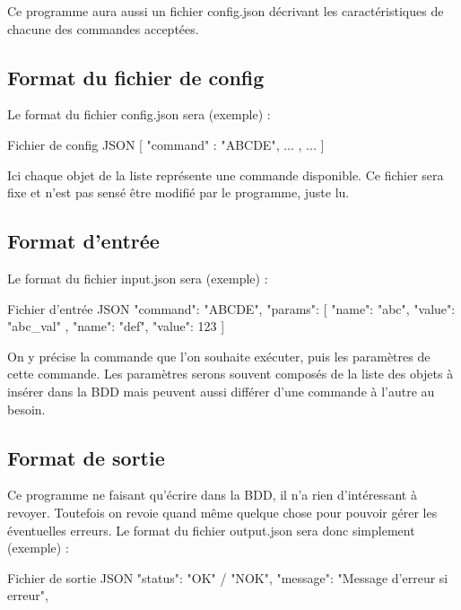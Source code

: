 {Ce programme aura aussi un fichier config.json décrivant les caractéristiques de chacune des commandes acceptées.

\subsection{Format du fichier de config}

Le format du fichier config.json sera (exemple) :

\begin{Python}{Fichier de config JSON}
    [
        {
            "command" : "ABCDE",
            ...
        },
        { ... }
    ]
\end{Python}
	
Ici chaque objet de la liste représente une commande disponible.
Ce fichier sera fixe et n'est pas sensé être modifié par le programme, juste lu.

\subsection{Format d'entrée}

Le format du fichier input.json sera (exemple) :

\begin{Python}{Fichier d'entrée JSON}
    {
        "command":  "ABCDE",
        "params":  [
            { "name": "abc", "value": "abc_val" },
            { "name": "def", "value": 123 }
        ]
    }
\end{Python}

On y précise la commande que l'on souhaite exécuter, puis les paramètres de cette commande. Les paramètres serons souvent composés de la liste des objets à insérer dans la BDD mais peuvent aussi différer d'une commande à l'autre au besoin.

\subsection{Format de sortie}

Ce programme ne faisant qu’écrire dans la BDD, il n’a rien d’intéressant à revoyer. Toutefois on revoie quand même quelque chose pour pouvoir gérer les éventuelles erreurs. Le format du fichier output.json sera donc simplement (exemple) :

\begin{Python}{Fichier de sortie JSON}
    {
        "status": "OK" / "NOK",
        "message": "Message d’erreur si erreur",
    }
\end{Python}



}
